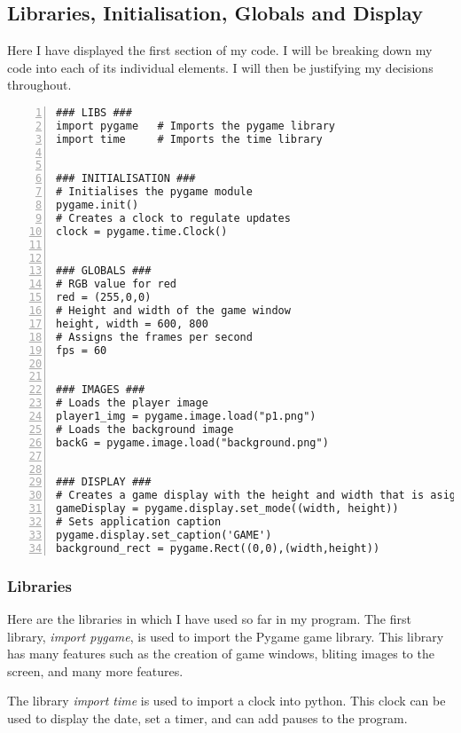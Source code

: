 \documentclass[12pt]{report}
\begin{document}
\subsection{Libraries, Initialisation, Globals and Display}
Here I have displayed the first section of my code. I will be breaking down my code into each of its individual elements. I will then be justifying my decisions throughout.

\small

\begin{Verbatim}[numbers=left, frame=single]
### LIBS ###
import pygame   # Imports the pygame library                                   
import time     # Imports the time library                                        

    
### INITIALISATION ###
# Initialises the pygame module
pygame.init()       
# Creates a clock to regulate updates
clock = pygame.time.Clock()        


### GLOBALS ###
# RGB value for red
red = (255,0,0)     
# Height and width of the game window
height, width = 600, 800     
# Assigns the frames per second
fps = 60                                                            


### IMAGES ###
# Loads the player image
player1_img = pygame.image.load("p1.png")
# Loads the background image
backG = pygame.image.load("background.png")


### DISPLAY ###
# Creates a game display with the height and width that is asigned
gameDisplay = pygame.display.set_mode((width, height))
# Sets application caption
pygame.display.set_caption('GAME')                                  
background_rect = pygame.Rect((0,0),(width,height))
\end{Verbatim}

\normalsize

\pagebreak

\subsubsection{Libraries}
Here are the libraries in which I have used so far in my program. The first library, \textit{import pygame}, is used to import the Pygame game library. This library has many features such as the creation of game windows, bliting images to the screen, and many more features. 

The library \textit{import time} is used to import a clock into python. This clock can be used to display the date, set a timer, and can add pauses to the program. 
\end{document}
